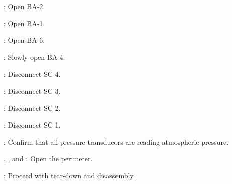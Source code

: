 \begin{checklist}
    \item \primary{}: Open BA-2.
    \item \primary{}: Open BA-1. 
    \item \primary{}: Open BA-6.
    \item \primary{}: Slowly open BA-4.
    \item \primary{}: Disconnect SC-4.
    \item \primary{}: Disconnect SC-3.
    \item \primary{}: Disconnect SC-2.
    \item \primary{}: Disconnect SC-1.
    \item \daq{}: Confirm that all pressure transducers are reading atmospheric pressure.
    \item \peri{}, \perii{}, and \periii{}: Open the perimeter.
    \item \ops{}: Proceed with tear-down and disassembly.
\end{checklist}

